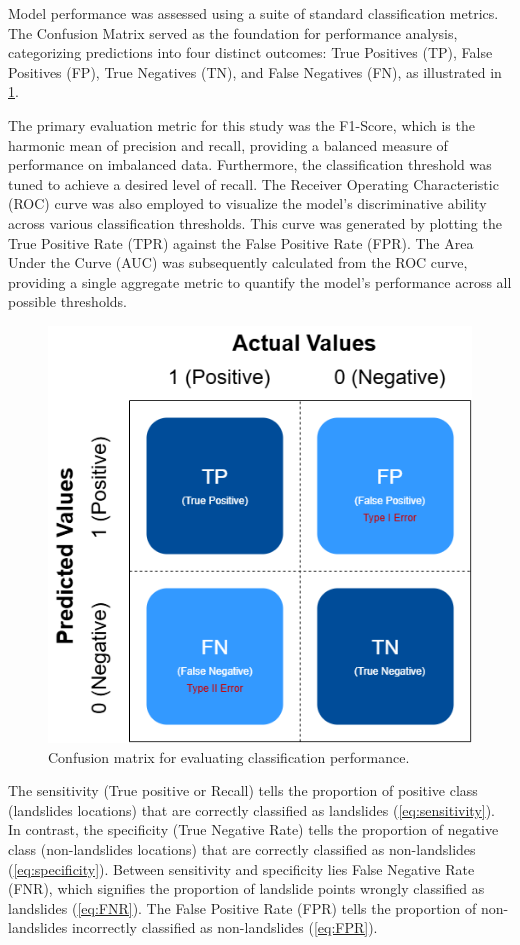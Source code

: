 Model performance was assessed using a suite of standard classification metrics. The Confusion Matrix served as the foundation for performance analysis\cite{mthd09}, categorizing predictions into four distinct outcomes: True Positives (TP), False Positives (FP), True Negatives (TN), and False Negatives (FN), as illustrated in \ref{fig}.

The primary evaluation metric for this study was the F1-Score, which is the harmonic mean of precision and recall, providing a balanced measure of performance on imbalanced data. Furthermore, the classification threshold was tuned to achieve a desired level of recall. The Receiver Operating Characteristic (ROC) curve was also employed to visualize the model's discriminative ability across various classification thresholds. This curve was generated by plotting the True Positive Rate (TPR) against the False Positive Rate (FPR). The Area Under the Curve (AUC) was subsequently calculated from the ROC curve, providing a single aggregate metric to quantify the model's performance across all possible thresholds.
\begin{figure}[H]
    \centerline{\includegraphics[width=\linewidth]{fig5.png}}
    \caption{Confusion matrix for evaluating classification performance.}
    \label{fig}
\end{figure}

The sensitivity (True positive or Recall) tells the proportion of positive class (landslides locations) that are correctly classified as landslides (\ref{eq:sensitivity}). In contrast, the specificity (True Negative Rate) tells the proportion of negative class (non-landslides locations) that are correctly classified as non-landslides (\ref{eq:specificity}). Between sensitivity and specificity lies False Negative Rate (FNR), which signifies the proportion of landslide points wrongly classified as landslides (\ref{eq:FNR}). The False Positive Rate (FPR) tells the proportion of non-landslides incorrectly classified as non-landslides (\ref{eq:FPR}).

